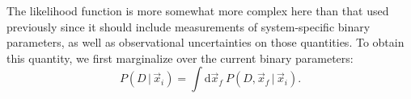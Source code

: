 \documentclass[usenatbib]{mnras}
\newcommand{\given}{\,|\,}
\newcommand{\dd}{\mathrm{d}}
\begin{document}
The likelihood function is more somewhat more complex here than that used previously since it should include measurements of system-specific binary parameters, as well as observational uncertainties on those quantities. To obtain this quantity, we first marginalize over the current binary parameters:
\begin{equation}
P(D \given \vec{x}_i) = \int \dd \vec{x}_f\ P(D, \vec{x}_f \given \vec{x}_i). \label{eq:marginalized_D}
\end{equation}








\end{document}

